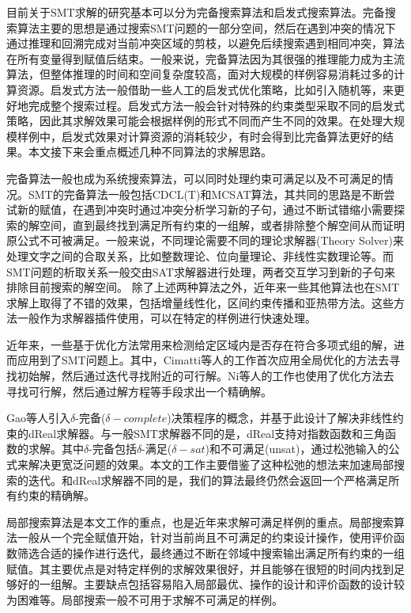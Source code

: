 目前关于SMT求解的研究基本可以分为完备搜索算法和启发式搜索算法。完备搜索算法主要的思想是通过搜索SMT问题的一部分空间，然后在遇到冲突的情况下通过推理和回溯完成对当前冲突区域的剪枝，以避免后续搜索遇到相同冲突，算法在所有变量得到赋值后结束。一般来说，完备算法因为其很强的推理能力成为主流算法，但整体推理的时间和空间复杂度较高，面对大规模的样例容易消耗过多的计算资源。启发式方法一般借助一些人工的启发式优化策略，比如引入随机等，来更好地完成整个搜索过程。启发式方法一般会针对特殊的约束类型采取不同的启发式策略，因此其求解效果可能会根据样例的形式不同而产生不同的效果。在处理大规模样例中，启发式效果对计算资源的消耗较少，有时会得到比完备算法更好的结果。本文接下来会重点概述几种不同算法的求解思路。

完备算法一般也成为系统搜索算法，可以同时处理约束可满足以及不可满足的情况。SMT的完备算法一般包括CDCL(T)\cite{NieuwenhuisOT06}和MCSAT算法\cite{JovanovicM12,MouraJ13}，其共同的思路是不断尝试新的赋值，在遇到冲突时通过冲突分析学习新的子句，通过不断试错缩小需要探索的解空间，直到最终找到满足所有约束的一组解，或者排除整个解空间从而证明原公式不可被满足。一般来说，不同理论需要不同的理论求解器(Theory Solver)来处理文字之间的合取关系，比如整数理论、位向量理论、非线性实数理论等。而SMT问题的析取关系一般交由SAT求解器进行处理，两者交互学习到新的子句来排除目前搜索的解空间。
除了上述两种算法之外，近年来一些其他算法也在SMT求解上取得了不错的效果，包括增量线性化\cite{Incremental2}，区间约束传播\cite{KhanhO12,TungKO17}和亚热带方法\cite{FontaineOSV17,NalbachA23}。这些方法一般作为求解器插件使用，可以在特定的样例进行快速处理。

近年来，一些基于优化方法常用来检测给定区域内是否存在符合多项式组的解，进而应用到了SMT问题上。其中，Cimatti等人的工作\cite{CimattiGLS22}首次应用全局优化的方法去寻找初始解，然后通过迭代寻找附近的可行解。Ni等人的工作也使用了优化方法去寻找可行解\cite{NiWX23}，然后通过解方程\cite{LiXZ23b}等手段求出一个精确解。

Gao等人引入$\delta$-完备($\delta-complete$)决策程序的概念，并基于此设计了解决非线性约束的dReal求解器。与一般SMT求解器不同的是，dReal支持对指数函数和三角函数的求解。其中$\delta$-完备包括$\delta$-满足($\delta-sat$)和不可满足(unsat)，通过松弛输入的公式来解决更宽泛问题的效果。本文的工作主要借鉴了这种松弛的想法来加速局部搜索的迭代。和dReal求解器不同的是，我们的算法最终仍然会返回一个严格满足所有约束的精确解。

局部搜索算法是本文工作的重点，也是近年来求解可满足样例的重点。局部搜索算法一般从一个完全赋值开始，针对当前尚且不可满足的约束设计操作，使用评价函数筛选合适的操作进行迭代，最终通过不断在邻域中搜索输出满足所有约束的一组赋值。其主要优点是对特定样例的求解效果很好，并且能够在很短的时间内找到足够好的一组解。主要缺点包括容易陷入局部最优、操作的设计和评价函数的设计较为困难等。局部搜索一般不可用于求解不可满足的样例。
